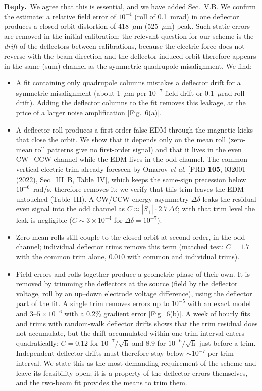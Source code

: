 \documentclass[11pt,a4paper]{article}
\newcommand{\reply}{\noindent\textbf{Reply.}~}
\begin{document}
\reply We agree that this is essential, and we have added Sec.~V.B. We confirm the estimate: a relative field
error of $10^{-4}$ (roll of 0.1~mrad) in one deflector produces a closed-orbit distortion of 418~$\mu$m
(525~$\mu$m) peak. Such static errors are removed in the initial calibration; the relevant question for our
scheme is the \emph{drift} of the deflectors between calibrations, because the electric force does not
reverse with the beam direction and the deflector-induced orbit therefore appears in the same (sum) channel
as the symmetric quadrupole misalignment. We find:
\begin{itemize}[nosep]
\item A fit containing only quadrupole columns mistakes a deflector drift for a symmetric misalignment
(about 1~$\mu$m per $10^{-7}$ field drift or 0.1~$\mu$rad roll drift). Adding the deflector columns to the
fit removes this leakage, at the price of a larger noise amplification [Fig.~6(a)].
\item A deflector roll produces a first-order false EDM through the magnetic kicks that close the orbit. We
show that it depends only on the mean roll (zero-mean roll patterns give no first-order signal) and that it lives
in the even CW+CCW channel while the EDM lives in the odd channel. The common vertical electric trim already
foreseen by Omarov \emph{et al.} [PRD \textbf{105}, 032001 (2022), Sec.~III~B, Table~IV], which keeps the same-sign precession below $10^{-6}$~rad/s,
therefore removes it; we verify that this trim leaves the EDM untouched (Table~III). A CW/CCW energy asymmetry
$\Delta\delta$ leaks the residual even signal into the odd channel as $C\approx|S_+|\cdot2.7\,\Delta\delta$; with
that trim level the leak is negligible ($C\sim3\times10^{-4}$ for $\Delta\delta=10^{-7}$).
\item Zero-mean rolls still couple to the closed orbit at second order, in the odd channel; individual
deflector trims remove this term (matched test: $C=1.7$ with the common trim alone, $0.010$ with common and
individual trims).
\item Field errors and rolls together produce a geometric phase of their own. It is removed by trimming the
deflectors at the source (field by the deflector voltage, roll by an up--down electrode voltage difference),
using the deflector part of the fit. A single trim removes errors up to $10^{-5}$ with an exact model and
$3$--$5\times10^{-6}$ with a 0.2\% gradient error [Fig.~6(b)]. A week of hourly fits and trims with
random-walk deflector drifts shows that the trim residual does not accumulate, but the drift accumulated within
one trim interval enters quadratically: $C=0.12$ for $10^{-7}/\sqrt{\mathrm{h}}$ and $8.9$ for
$10^{-6}/\sqrt{\mathrm{h}}$ just before a trim. Independent deflector drifts must therefore stay below
$\sim10^{-7}$ per trim interval. We state this as the most demanding requirement of the scheme and leave its
feasibility open; it is a property of the deflector errors themselves, and the two-beam fit provides the means
to trim them.
\end{itemize}
\end{document}
